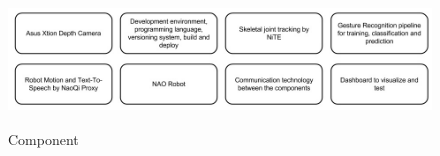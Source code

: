 \begin{figure}
	[h] \centering 
	\includegraphics[height=35mm]{figures/content/hri-components.jpg} \caption{Component} \label{fg:hri:components} 
\end{figure}
